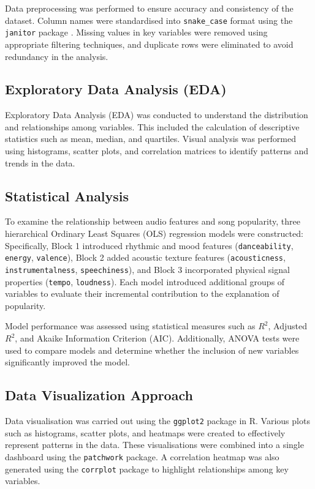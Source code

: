\documentclass[12pt,a4paper]{article}
\begin{document}
Data preprocessing was performed to ensure accuracy and consistency of
the dataset. Column names were standardised into \texttt{snake\_case}
format using the \texttt{janitor} package \citep{rcoreteam2023}. Missing values in key variables
were removed using appropriate filtering techniques, and duplicate rows
were eliminated to avoid redundancy in the analysis.

\subsection{Exploratory Data Analysis (EDA)}

Exploratory Data Analysis (EDA) was conducted to understand the
distribution and relationships among variables. This included the
calculation of descriptive statistics such as mean, median, and
quartiles. Visual analysis was performed using histograms, scatter plots,
and correlation matrices to identify patterns and trends in the data.

\subsection{Statistical Analysis}

To examine the relationship between audio features and song popularity,
three hierarchical Ordinary Least Squares (OLS) regression models were
constructed: 
Specifically, Block 1 introduced rhythmic and mood features
(\texttt{danceability}, \texttt{energy}, \texttt{valence}),
Block 2 added acoustic texture features (\texttt{acousticness},
\texttt{instrumentalness}, \texttt{speechiness}), and Block 3
incorporated physical signal properties (\texttt{tempo}, \texttt{loudness}). Each model introduced additional groups of variables to
evaluate their incremental contribution to the explanation of popularity.

Model performance was assessed using statistical measures such as
$R^2$, Adjusted $R^2$, and Akaike Information Criterion (AIC).
Additionally, ANOVA tests were used to compare models and determine
whether the inclusion of new variables significantly improved the model.

\subsection{Data Visualization Approach}

Data visualisation was carried out using the \texttt{ggplot2} package in
R. Various plots such as histograms, scatter plots, and heatmaps were
created to effectively represent patterns in the data. These visualisations were combined into a single dashboard using the
\texttt{patchwork} package. A correlation heatmap was also generated
using the \texttt{corrplot} package to highlight relationships among
key variables.
\end{document}
